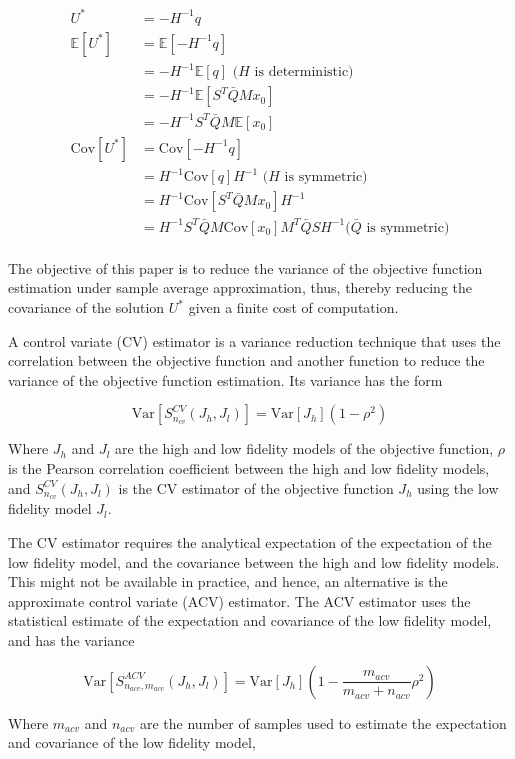 \documentclass{article}
\begin{document}
$$
\begin{aligned}
  U^* &= -H^{-1} q \\
  \mathbb{E}[U^*] &= \mathbb{E}[-H^{-1} q] \\
  &= -H^{-1} \mathbb{E}[q] \text{ ($H$ is deterministic)} \\
  &= -H^{-1} \mathbb{E}[S^T \bar{Q} M x_0] \\
  &= -H^{-1} S^T \bar{Q} M \mathbb{E}[x_0] \\
  \text{Cov}[U^*] &= \text{Cov}[-H^{-1} q] \\
  &= H^{-1} \text{Cov}[q] H^{-1} \text{ ($H$ is symmetric)} \\
  &= H^{-1} \text{Cov}[S^T \bar{Q} M x_0] H^{-1} \\
  &= H^{-1} S^T \bar{Q} M \text{Cov}[x_0] M^T \bar{Q} S H^{-1} \text{($\bar{Q}$ is symmetric)} \\
\end{aligned}
$$

The objective of this paper is to reduce the variance of the objective function estimation under sample average approximation,
thus, thereby reducing the covariance of the solution $U^*$ given a finite cost of computation.

A control variate (CV) estimator is a variance reduction technique that uses the correlation between the objective function
and another function to reduce the variance of the objective function estimation. Its variance has the form

$$
\text{Var}[S_{n_{cv}}^{CV}(J_h, J_l)] = \text{Var}[J_h] (1 - \rho^2)
$$

Where $J_h$ and $J_l$ are the high and low fidelity models of the objective function, $\rho$ is the Pearson correlation
coefficient between the high and low fidelity models, and $S_{n_{cv}}^{CV}(J_h, J_l)$ is the CV estimator of the objective
function $J_h$ using the low fidelity model $J_l$.

The CV estimator requires the analytical expectation of the expectation of the low fidelity model, and the covariance between
the high and low fidelity models. This might not be available in practice, and hence, an alternative is the approximate
control variate (ACV) estimator. The ACV estimator uses the statistical estimate of the expectation and covariance
of the low fidelity model, and has the variance

$$
\text{Var}[S_{n_{acv},m_{acv}}^{ACV}(J_h, J_l)] = \text{Var}[J_h] (1 - \frac{m_{acv}}{m_{acv} + n_{acv}} \rho^2)
$$

Where $m_{acv}$ and $n_{acv}$ are the number of samples used to estimate the expectation and covariance of the low fidelity model,
\end{document}
